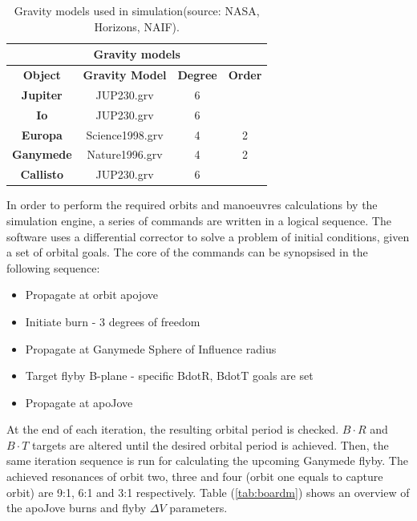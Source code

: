 \begin{table}[htb]
  \centering
    \begin{tabular}{|c|c|c|c|}
    \hline
    \multicolumn{4}{|c|}{\textbf{Gravity models}} \bigstrut\\
    \hline
    \textbf{Object} & \textbf{Gravity Model} & \textbf{Degree} & \textbf{Order} \bigstrut\\
    \hline
    \textbf{Jupiter} & JUP230.grv & 6     &  \bigstrut\\
    \hline
    \textbf{Io} & JUP230.grv & 6     &  \bigstrut\\
    \hline
    \textbf{Europa} & Science1998.grv & 4     & 2 \bigstrut\\
    \hline
    \textbf{Ganymede} & Nature1996.grv & 4     & 2 \bigstrut\\
    \hline
    \textbf{Callisto} & JUP230.grv & 6     &  \bigstrut\\
    \hline
    \end{tabular}%
    \caption{Gravity models used in simulation(source: NASA, Horizons, NAIF).\cite{Gravm}}\label{tab:gravf}
\end{table}%

In order to perform the required orbits and manoeuvres calculations by the simulation engine, a series of commands are written in a logical sequence. The software uses a differential corrector to solve a problem of initial conditions, given a set of orbital goals. 
The core of the commands can be synopsised in the following sequence:

\begin{itemize}
  \item Propagate at orbit apojove
  \item Initiate burn - 3 degrees of freedom
  \item Propagate at Ganymede Sphere of Influence radius
  \item Target flyby B-plane - specific BdotR, BdotT goals are set
  \item Propagate at apoJove
\end{itemize}

At the end of each iteration, the resulting orbital period is checked. $B\cdot R$ and $B\cdot T$ targets are altered until the desired orbital period is achieved. Then, the same iteration sequence is run for calculating the upcoming Ganymede flyby. The achieved resonances of orbit two, three and four (orbit one equals to capture orbit) are 9:1, 6:1 and 3:1 respectively. 
Table (\ref{tab:boardm}) shows an overview of the apoJove burns and flyby $\Delta V$ parameters.

